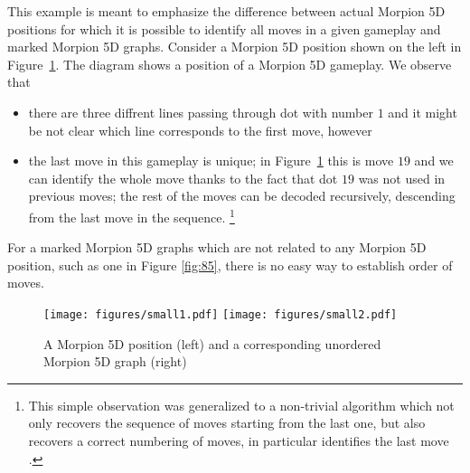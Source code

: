 \begin{example}
This example is meant to emphasize the difference between 
actual Morpion 5D positions for which it is possible to identify all moves in a given gameplay and marked Morpion 5D graphs.
Consider a Morpion 5D position shown on the left in Figure~\ref{fig:small}. %
The diagram shows a position of a Morpion 5D gameplay.
We observe that %
  \begin{itemize}
    \item   %
            there are three diffrent lines passing through dot with number $1$ and it might be not clear which line corresponds to the first move, however
    \item   the last move in this gameplay is unique; in Figure~\ref{fig:small} this is move $19$ and we can identify the whole move thanks to the fact  that dot $19$ was not used in previous moves; the rest of the moves can be decoded recursively, descending from the last move in the sequence. \footnote{This simple observation was generalized to a non-trivial algorithm which not only recovers the sequence of moves starting from the last one, but also recovers a correct numbering of moves, in particular identifies the last move \cite{demaine}.} %
  \end{itemize}
For a marked Morpion 5D graphs which are not related to any Morpion 5D position, such as one in Figure \ref{fig:85}, there is no easy way to establish order of moves.
\end{example}


\begin{figure}
    \texttt{[image: figures/small1.pdf]}
    \texttt{[image: figures/small2.pdf]}
    \caption{\label{fig:small}
      A Morpion 5D position (left) and a corresponding unordered Morpion 5D graph (right)
    }
\end{figure}


